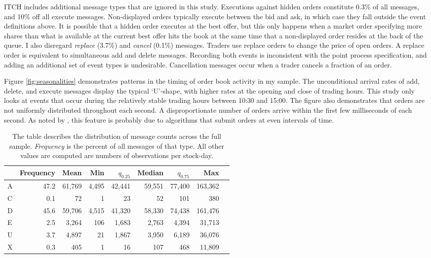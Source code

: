 	ITCH includes additional message types that are ignored in this study. Executions against hidden orders constitute 0.3\% of all messages, and 10\% off all execute messages. Non-displayed orders typically execute between the bid and ask, in which case they fall outside the event definitions above. It is possible that a hidden order executes at the best offer, but this only happens when a market order specifying more shares than what is available at the current best offer hits the book at the same time that a non-displayed order resides at the back of the queue. I also disregard \textit{replace} (3.7\%) and \textit{cancel} (0.1\%) messages.
	Traders use replace orders to change the price of open orders. A replace order is equivalent to simultaneous add and delete messages. Recording both events is inconsistent with the point process specification, and adding an additional set of event types is undesirable. Cancellation messages occur when a trader cancels a fraction of an order.

	Figure \ref{fig:seasonalities} demonstrates patterns in the timing of order book activity in my sample. The unconditional arrival rates of add, delete, and execute messages display the typical `U'-shape, with higher rates at the opening and close of trading hours. This study only looks at events that occur during the relatively stable trading hours between 10:30 and 15:00. The figure also demonstrates that orders are not uniformly distributed throughout each second. A disproportionate number of orders arrive within the first few milliseconds of each second. As noted by \cite{Hasbrouck2013}, this feature is probably due to algorithms that submit orders at even intervals of time.

	\begin{table}[t]
	\small
	\linespread{1}
	\centering
	\captionsetup{position=below, font=footnotesize, justification=justified, width=\linewidth}
	\caption[Message counts]{The table describes the distribution of message counts across the full sample. \textit{Frequency} is the percent of all messages of that type. All other values are computed are numbers of observations per stock-day.}
	\label{tab:message_counts}
	\begin{tabular*}{\textwidth}{@{\extracolsep{\fill}}lrrrrrrrr}
		\toprule{}
		 &  Frequency  &   Mean  & Min &  $q_{0.25}$ &  Median &    $q_{0.75}$   &        Max \\
		\midrule
		A &  47.2  &  61,769 &  4,495 &  42,441 &  59,551 &  77,400 &  163,362 \\
		C &  0.1   &      72 &     1  &      23 &      52 &     101 &      380 \\
		D &  45.6  &  59,706 &  4,515 &  41,320 &  58,330 &  74,438 &  161,476 \\
		E &  2.5   &   3,264 &   106  &   1,683 &   2,763 &   4,394 &   31,713 \\
		U &  3.7   &   4,897 &     21 &   1,867 &   3,950 &   6,189 &   36,076 \\
		X &  0.3   &     405 &      1 &      16 &     107 &     468 &   11,809 \\
		\bottomrule
	\end{tabular*}
	\end{table}

